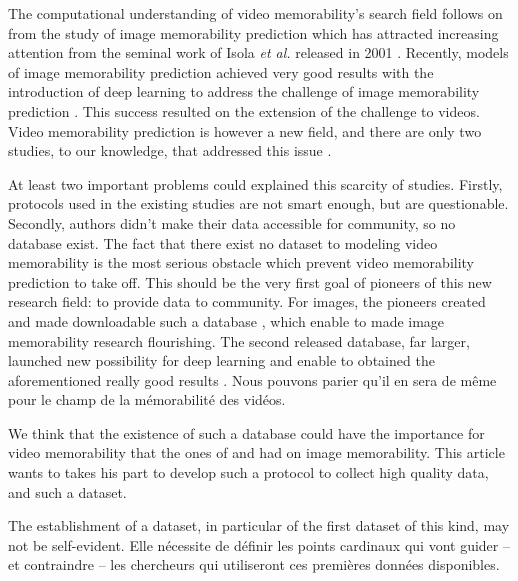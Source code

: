 \documentclass[sigconf]{acmart}
\begin{document}
The computational understanding of video memorability's search field follows on from the study of image memorability prediction which has attracted increasing attention from the seminal work of Isola \textit{et al.} released in 2001 \cite{isola_2011_makes}.
Recently, models of image memorability prediction achieved very good results with the introduction of deep learning to address the challenge of image memorability prediction \cite{khosla_2015_understanding,baveye_2016_deep,squalli_2017_deep}.
This success resulted on the extension of the challenge to videos.
Video memorability prediction is however a new field, and there are only two studies, to our knowledge, that addressed this issue \cite{han_2015_learning,shekhar_2017_show}.

At least two important problems could explained this scarcity of studies.
Firstly, protocols used in the existing studies are not smart enough, but are questionable.
Secondly, authors didn't make their data accessible for community, so no database exist.
The fact that there exist no dataset to modeling video memorability is the most serious obstacle which prevent video memorability prediction to take off.
This should be the very first goal of pioneers of this new research field: to provide data to community.
For images, the pioneers created and made downloadable such a database \cite{isola_2011_makes}, which enable to made image memorability research flourishing.
The second released database, far larger, launched new possibility for deep learning and enable to obtained the aforementioned really good results \cite{khosla_2015_understanding}.
Nous pouvons parier qu'il en sera de même pour le champ de la mémorabilité des vidéos.

We think that the existence of such a database could have the importance for video memorability that the ones of \cite{isola_2011_makes} and \cite{khosla_2015_understanding} had on image memorability.%
This article wants to takes his part to develop such a protocol to collect high quality data, and such a dataset.

The establishment of a dataset, in particular of the first dataset of this kind, may not be self-evident.
Elle nécessite de définir les points cardinaux qui vont guider – et contraindre – les chercheurs qui utiliseront ces premières données disponibles.
\end{document}
